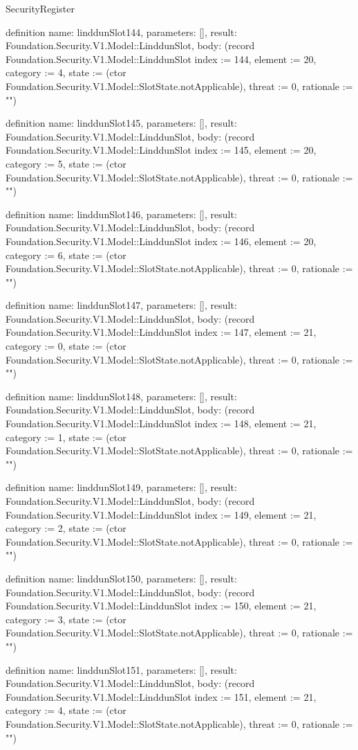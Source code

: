 \begin{lexlean}{SecurityRegister}
\begin{semanticmodule}
definition{
  name: linddunSlot144,
  parameters: [],
  result: Foundation.Security.V1.Model::LinddunSlot,
  body: (record Foundation.Security.V1.Model::LinddunSlot {index := 144, element := 20, category := 4, state := (ctor Foundation.Security.V1.Model::SlotState.notApplicable), threat := 0, rationale := ""})
}

definition{
  name: linddunSlot145,
  parameters: [],
  result: Foundation.Security.V1.Model::LinddunSlot,
  body: (record Foundation.Security.V1.Model::LinddunSlot {index := 145, element := 20, category := 5, state := (ctor Foundation.Security.V1.Model::SlotState.notApplicable), threat := 0, rationale := ""})
}

definition{
  name: linddunSlot146,
  parameters: [],
  result: Foundation.Security.V1.Model::LinddunSlot,
  body: (record Foundation.Security.V1.Model::LinddunSlot {index := 146, element := 20, category := 6, state := (ctor Foundation.Security.V1.Model::SlotState.notApplicable), threat := 0, rationale := ""})
}

definition{
  name: linddunSlot147,
  parameters: [],
  result: Foundation.Security.V1.Model::LinddunSlot,
  body: (record Foundation.Security.V1.Model::LinddunSlot {index := 147, element := 21, category := 0, state := (ctor Foundation.Security.V1.Model::SlotState.notApplicable), threat := 0, rationale := ""})
}

definition{
  name: linddunSlot148,
  parameters: [],
  result: Foundation.Security.V1.Model::LinddunSlot,
  body: (record Foundation.Security.V1.Model::LinddunSlot {index := 148, element := 21, category := 1, state := (ctor Foundation.Security.V1.Model::SlotState.notApplicable), threat := 0, rationale := ""})
}

definition{
  name: linddunSlot149,
  parameters: [],
  result: Foundation.Security.V1.Model::LinddunSlot,
  body: (record Foundation.Security.V1.Model::LinddunSlot {index := 149, element := 21, category := 2, state := (ctor Foundation.Security.V1.Model::SlotState.notApplicable), threat := 0, rationale := ""})
}

definition{
  name: linddunSlot150,
  parameters: [],
  result: Foundation.Security.V1.Model::LinddunSlot,
  body: (record Foundation.Security.V1.Model::LinddunSlot {index := 150, element := 21, category := 3, state := (ctor Foundation.Security.V1.Model::SlotState.notApplicable), threat := 0, rationale := ""})
}

definition{
  name: linddunSlot151,
  parameters: [],
  result: Foundation.Security.V1.Model::LinddunSlot,
  body: (record Foundation.Security.V1.Model::LinddunSlot {index := 151, element := 21, category := 4, state := (ctor Foundation.Security.V1.Model::SlotState.notApplicable), threat := 0, rationale := ""})
}


\end{semanticmodule}
\end{lexlean}
